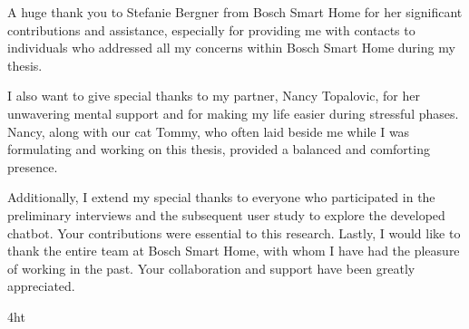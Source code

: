 \documentclass[
  a4paper,  %
  twoside,  %
  bibliography=totoc,
  headsepline,
  cleardoublepage=empty,
  parskip=half,
  draft=false
]{scrbook}
\begin{document}
A huge thank you to Stefanie Bergner from Bosch Smart Home for her significant contributions and assistance, especially for providing me with contacts to individuals who addressed all my concerns within Bosch Smart Home during my thesis.

I also want to give special thanks to my partner, Nancy Topalovic, for her unwavering mental support and for making my life easier during stressful phases. Nancy, along with our cat Tommy, who often laid beside me while I was formulating and working on this thesis, provided a balanced and comforting presence.

Additionally, I extend my special thanks to everyone who participated in the preliminary interviews and the subsequent user study to explore the developed chatbot. Your contributions were essential to this research. Lastly, I would like to thank the entire team at Bosch Smart Home, with whom I have had the pleasure of working in the past. Your collaboration and support have been greatly appreciated.
\cleardoublepage

\iftex4ht
\else
\fi

%
%

%
%
%
\tableofcontents


\listoffigures
\listoftables

\ifdeutsch
\else
\fi

\end{document}

